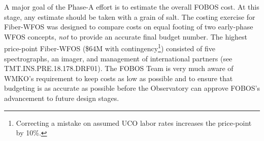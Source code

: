 
A major goal of the Phase-A effort is to estimate the overall FOBOS cost.  At this stage, any estimate should be taken with a grain of salt.  The costing exercise for Fiber-WFOS was designed to compare costs on equal footing of two early-phase WFOS concepts, {\it not} to provide an accurate final budget number.  The highest price-point Fiber-WFOS (\$64M with contingency\footnote{Correcting a mistake on assumed UCO labor rates increases the price-point by 10\%.}) consisted of five spectrographs, an imager, and management of international partners (see TMT.INS.PRE.18.178.DRF01).  The FOBOS Team is very much aware of WMKO's requirement to keep costs as low as possible and to ensure that budgeting is as accurate as possible before the Observatory can approve FOBOS's advancement to future design stages.  





